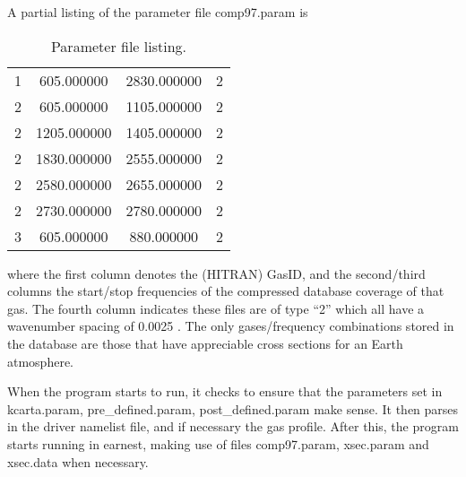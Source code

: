 \documentclass[12pt]{article}
\begin{document}
A partial listing of the parameter file {\sf comp97.param} is\\
\begin{center}
\begin{small}
\begin{longtable}{cccc}
\caption{Parameter file listing.}\\
  1 &    605.000000 &    2830.000000 & 2\\
  2 &    605.000000 &    1105.000000 & 2\\
  2 &   1205.000000 &    1405.000000 & 2\\
  2 &   1830.000000 &    2555.000000 & 2\\
  2 &   2580.000000 &    2655.000000 & 2\\
  2 &   2730.000000 &    2780.000000 & 2\\
  3 &    605.000000 &     880.000000 & 2\\
\end{longtable}
\end{small}
\end{center}
where the first column denotes the ({\sf HITRAN}) GasID, and the second/third 
columns the start/stop frequencies of the compressed database coverage of 
that gas. The fourth column indicates these files are of type ``2''
which all have a wavenumber spacing of 0.0025 \wn. 
The only gases/frequency combinations stored in the database are 
those that have appreciable cross sections for an Earth atmosphere.

When the program starts to run, it checks to ensure that the parameters set 
in {\sf kcarta.param, pre\_defined.param, post\_defined.param} make sense.  
It then parses in the
driver namelist file, and if necessary the gas profile.  After this, the 
program starts running in earnest, making use of files {\sf comp97.param,
  xsec.param} and {\sf xsec.data} when necessary.

\end{document}
